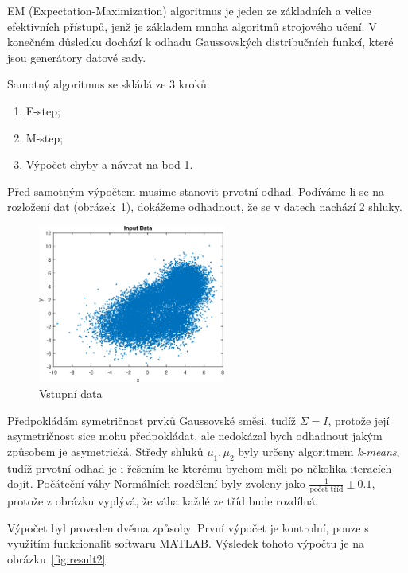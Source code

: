EM (Expectation-Maximization) algoritmus je jeden ze základních a velice efektivních přístupů, jenž je základem mnoha algoritmů strojového učení.
V konečném důsledku dochází k odhadu Gaussovských distribučních funkcí, které jsou generátory datové sady.

Samotný algoritmus se skládá ze 3 kroků:

\begin{enumerate}
    \item E-step;
    \item M-step;
    \item Výpočet chyby a návrat na bod 1.
\end{enumerate}

Před samotným výpočtem musíme stanovit prvotní odhad.
Podíváme-li se na rozložení dat (obrázek~\ref{fig:result1}), dokážeme odhadnout, že se v datech nachází 2 shluky.

\begin{figure}[htb]
    \centering
    \includegraphics[width=0.55\textwidth]{graphs/fig1.eps}
    \caption{Vstupní data}
    \label{fig:result1}
\end{figure}
\FloatBarrier

Předpokládám symetričnost prvků Gaussovské směsi, tudíž \( \Sigma = I \), protože její asymetričnost sice mohu předpokládat, ale nedokázal bych odhadnout jakým způsobem je asymetrická.
Středy shluků \( \mu_1, \mu_2 \) byly určeny algoritmem \textit{k-means}, tudíž prvotní odhad je i řešením ke kterému bychom měli po několika iteracích dojít.
Počáteční váhy Normálních rozdělení byly zvoleny jako \( \frac{1}{\text{počet tříd}} \pm 0.1 \), protože z obrázku vyplývá, že váha každé ze tříd bude rozdílná.

Výpočet byl proveden dvěma způsoby.
První výpočet je kontrolní, pouze s využitím funkcionalit softwaru MATLAB.
Výsledek tohoto výpočtu je na obrázku~\ref{fig:result2}.

